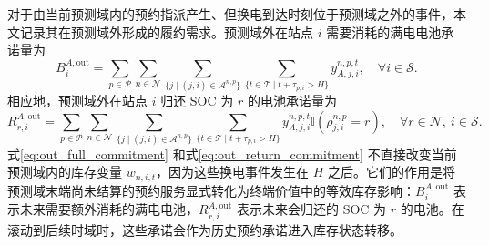 \documentclass[12pt,hyperref,a4paper,UTF8]{ctexart}
\begin{document}
对于由当前预测域内的预约指派产生、但换电到达时刻位于预测域之外的事件，本文记录其在预测域外形成的履约需求。预测域外在站点 $i$ 需要消耗的满电电池承诺量为
\begin{equation}
B_{i}^{A,\mathrm{out}}
=
\sum_{p\in\mathcal{P}}
\sum_{n\in\mathcal{N}}
\sum_{\{j\mid (j,i)\in\mathcal{A}^{n,p}\}}
\sum_{\{t\in\mathcal{T}\mid t+\tau_{p,i}>H\}}
y_{A,j,i}^{n,p,t},
\quad \forall i\in\mathcal{S}.
\label{eq:out_full_commitment}
\end{equation}
相应地，预测域外在站点 $i$ 归还 SOC 为 $r$ 的电池承诺量为
\begin{equation}
R_{r,i}^{A,\mathrm{out}}
=
\sum_{p\in\mathcal{P}}
\sum_{n\in\mathcal{N}}
\sum_{\{j\mid (j,i)\in\mathcal{A}^{n,p}\}}
\sum_{\{t\in\mathcal{T}\mid t+\tau_{p,i}>H\}}
y_{A,j,i}^{n,p,t}
\mathbb{I}\!\left(\rho_{j,i}^{n,p}=r\right),
\quad \forall r\in\mathcal{N},\ i\in\mathcal{S}.
\label{eq:out_return_commitment}
\end{equation}
式\eqref{eq:out_full_commitment} 和式\eqref{eq:out_return_commitment} 不直接改变当前预测域内的库存变量 $w_{n,i,t}$，因为这些换电事件发生在 $H$ 之后。它们的作用是将预测域末端尚未结算的预约服务显式转化为终端价值中的等效库存影响：$B_{i}^{A,\mathrm{out}}$ 表示未来需要额外消耗的满电电池，$R_{r,i}^{A,\mathrm{out}}$ 表示未来会归还的 SOC 为 $r$ 的电池。在滚动到后续时域时，这些承诺会作为历史预约承诺进入库存状态转移。
\end{document}

